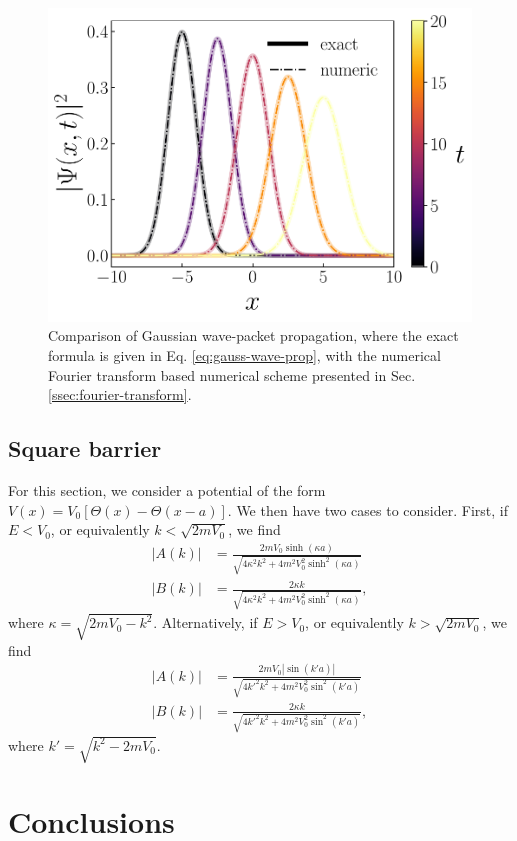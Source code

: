 \begin{figure}[tb]
    \centering
    \includegraphics[width=0.7\linewidth]{gauss_wave-prop.pdf}
    \caption{Comparison of Gaussian wave-packet propagation, where the exact formula is given in Eq. \ref{eq:gauss-wave-prop}, with the numerical Fourier transform based numerical scheme presented in Sec. \ref{ssec:fourier-transform}.}
    \label{fig:gauss-wave-prop}
\end{figure}


\subsection{Square barrier}
\label{ssec:square-barrier}

For this section, we consider a potential of the form $V(x) = V_0 [ \Theta(x) - \Theta(x - a) ]$.
We then have two cases to consider.
First, if $E < V_0$, or equivalently $k < \sqrt{2 m V_0}$, we find
\begin{align}
    |A(k)| &= \frac{2 m V_0 \sinh(\kappa a)}{\sqrt{4 \kappa^2 k^2 + 4 m^2 V_0^2 \sinh^2(\kappa a)}} \\
    |B(k)| &= \frac{2 \kappa k}{\sqrt{4 \kappa^2 k^2 + 4 m^2 V_0^2 \sinh^2(\kappa a)}}
,\end{align}
where $\kappa = \sqrt{2 m V_0 - k^2}$.
Alternatively, if $E > V_0$, or equivalently $k > \sqrt{2 m V_0}$, we find
\begin{align}
    |A(k)| &= \frac{2 m V_0 |\sin(k' a)|}{\sqrt{4 k'^2 k^2 + 4 m^2 V_0^2 \sin^2(k' a)}} \\
    |B(k)| &= \frac{2 \kappa k}{\sqrt{4 k'^2 k^2 + 4 m^2 V_0^2 \sin^2(k' a)}}
,\end{align}
where $k' = \sqrt{k^2 - 2 m V_0}$.





\section{Conclusions}
\label{sec:conclusions}




